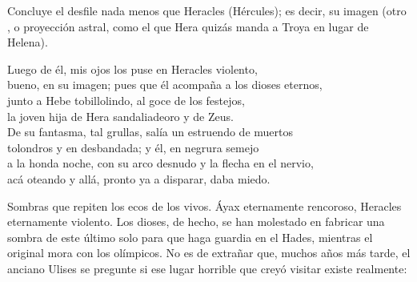 Concluye el desfile nada menos que Heracles (Hércules); es decir, su imagen (otro , o proyección astral, como el que Hera quizás manda a Troya en lugar de Helena).

\begin{versocita}
Luego de él, mis ojos los puse en Heracles violento,\\
bueno, en su imagen; pues que él acompaña a los dioses eternos,\\
junto a Hebe tobillolindo, al goce de los festejos,\\
la joven hija de Hera sandaliadeoro y de Zeus.\\
De su fantasma, tal grullas, salía un estruendo de muertos\\
tolondros y en desbandada; y él, en negrura semejo\\
a la honda noche, con su arco desnudo y la flecha en el nervio,\\
acá oteando y allá, pronto ya a disparar, daba miedo.
\end{versocita}

Sombras que repiten los ecos de los vivos. Áyax eternamente rencoroso, Heracles eternamente violento. Los dioses, de hecho, se han molestado en fabricar una sombra de este último solo para que haga guardia en el Hades, mientras el original mora con los olímpicos. No es de extrañar que, muchos años más tarde, el anciano Ulises se pregunte si ese lugar horrible que creyó visitar existe realmente:

